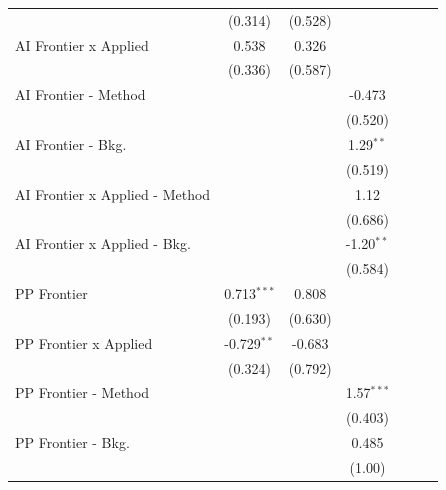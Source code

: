 \begin{tabular}{lcccccc}
                                  & (0.314)       & (0.528) &              &       &       &   \\   
   AI Frontier x Applied          & 0.538         & 0.326   &              &       &       &   \\   
                                  & (0.336)       & (0.587) &              &       &       &   \\   
   AI Frontier - Method           &               &         & -0.473       &       &       &   \\   
                                  &               &         & (0.520)      &       &       &   \\   
   AI Frontier - Bkg.             &               &         & 1.29$^{**}$  &       &       &   \\   
                                  &               &         & (0.519)      &       &       &   \\   
   AI Frontier x Applied - Method &               &         & 1.12         &       &       &   \\   
                                  &               &         & (0.686)      &       &       &   \\   
   AI Frontier x Applied - Bkg.   &               &         & -1.20$^{**}$ &       &       &   \\   
                                  &               &         & (0.584)      &       &       &   \\   
   PP Frontier                    & 0.713$^{***}$ & 0.808   &              &       &       &   \\   
                                  & (0.193)       & (0.630) &              &       &       &   \\   
   PP Frontier x Applied          & -0.729$^{**}$ & -0.683  &              &       &       &   \\   
                                  & (0.324)       & (0.792) &              &       &       &   \\   
   PP Frontier - Method           &               &         & 1.57$^{***}$ &       &       &   \\   
                                  &               &         & (0.403)      &       &       &   \\   
   PP Frontier - Bkg.             &               &         & 0.485        &       &       &   \\   
                                  &               &         & (1.00)       &       &       &   \\   

\end{tabular}
